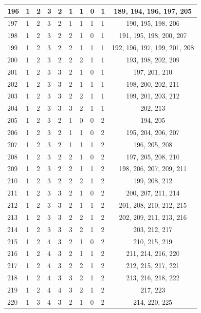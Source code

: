 \begin{longtable}{|l|l|l|l|l|l|l|l|l|c|}
196 & 1 & 2 & 3 & 2 & 1 & 1 & 0 & 1 & 189, 194, 196, 197, 205 \\ \hline
197 & 1 & 2 & 3 & 2 & 1 & 1 & 1 & 1 & 190, 195, 198, 206 \\ \hline
198 & 1 & 2 & 3 & 2 & 2 & 1 & 0 & 1 & 191, 195, 198, 200, 207 \\ \hline
199 & 1 & 2 & 3 & 2 & 2 & 1 & 1 & 1 & 192, 196, 197, 199, 201, 208 \\ \hline
200 & 1 & 2 & 3 & 2 & 2 & 2 & 1 & 1 & 193, 198, 202, 209 \\ \hline
201 & 1 & 2 & 3 & 3 & 2 & 1 & 0 & 1 & 197, 201, 210 \\ \hline
202 & 1 & 2 & 3 & 3 & 2 & 1 & 1 & 1 & 198, 200, 202, 211 \\ \hline
203 & 1 & 2 & 3 & 3 & 2 & 2 & 1 & 1 & 199, 201, 203, 212 \\ \hline
204 & 1 & 2 & 3 & 3 & 3 & 2 & 1 & 1 & 202, 213 \\ \hline
205 & 1 & 2 & 3 & 2 & 1 & 0 & 0 & 2 & 194, 205 \\ \hline
206 & 1 & 2 & 3 & 2 & 1 & 1 & 0 & 2 & 195, 204, 206, 207 \\ \hline
207 & 1 & 2 & 3 & 2 & 1 & 1 & 1 & 2 & 196, 205, 208 \\ \hline
208 & 1 & 2 & 3 & 2 & 2 & 1 & 0 & 2 & 197, 205, 208, 210 \\ \hline
209 & 1 & 2 & 3 & 2 & 2 & 1 & 1 & 2 & 198, 206, 207, 209, 211 \\ \hline
210 & 1 & 2 & 3 & 2 & 2 & 2 & 1 & 2 & 199, 208, 212 \\ \hline
211 & 1 & 2 & 3 & 3 & 2 & 1 & 0 & 2 & 200, 207, 211, 214 \\ \hline
212 & 1 & 2 & 3 & 3 & 2 & 1 & 1 & 2 & 201, 208, 210, 212, 215 \\ \hline
213 & 1 & 2 & 3 & 3 & 2 & 2 & 1 & 2 & 202, 209, 211, 213, 216 \\ \hline
214 & 1 & 2 & 3 & 3 & 3 & 2 & 1 & 2 & 203, 212, 217 \\ \hline
215 & 1 & 2 & 4 & 3 & 2 & 1 & 0 & 2 & 210, 215, 219 \\ \hline
216 & 1 & 2 & 4 & 3 & 2 & 1 & 1 & 2 & 211, 214, 216, 220 \\ \hline
217 & 1 & 2 & 4 & 3 & 2 & 2 & 1 & 2 & 212, 215, 217, 221 \\ \hline
218 & 1 & 2 & 4 & 3 & 3 & 2 & 1 & 2 & 213, 216, 218, 222 \\ \hline
219 & 1 & 2 & 4 & 4 & 3 & 2 & 1 & 2 & 217, 223 \\ \hline
220 & 1 & 3 & 4 & 3 & 2 & 1 & 0 & 2 & 214, 220, 225 \\ \hline

\end{longtable}
